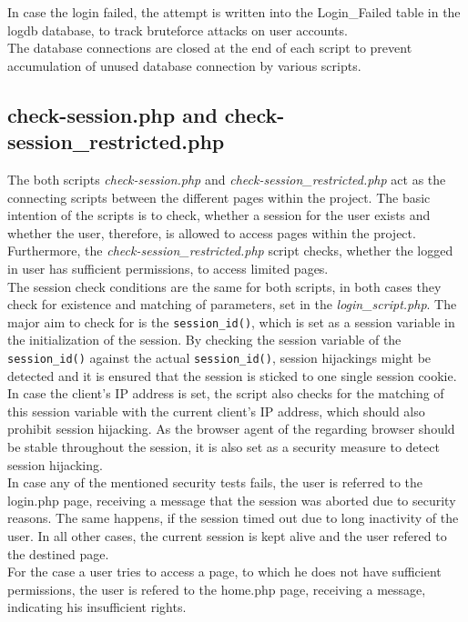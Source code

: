In case the login failed, the attempt is written into the Login\_Failed table in the logdb database, to track bruteforce attacks on user accounts.\\
The database connections are closed at the end of each script to prevent accumulation of unused database connection by various scripts.

\subsection{check-session.php and check-session\_restricted.php}
The both scripts \emph{check-session.php} and \emph{check-session\_restricted.php} act as the connecting scripts between the different pages within the project. The basic intention of the scripts is 
to check, whether a session for the user exists and whether the user, therefore, is allowed to access pages within the project. Furthermore, the \emph{check-session\_restricted.php} script checks,
whether the logged in user has sufficient permissions, to access limited pages.\\ 
The session check conditions are the same for both scripts, in both cases they check for existence and matching of parameters, set in the \emph{login\_script.php}. The major aim to check for is the 
\texttt{session\_id()}, which is set as a session variable in the initialization of the session. By checking the session variable of the \texttt{session\_id()} against the actual \texttt{session\_id()}, 
session hijackings might be detected and it is ensured that the session is sticked to one single session cookie. In case the client's IP address is set, the script also checks for the matching of this 
session variable with the current client's IP address, which should also prohibit session hijacking. As the browser agent of the regarding browser should be stable throughout the session, it is also 
set as a security measure to detect session hijacking.\\
In case any of the mentioned security tests fails, the user is referred to the login.php page, receiving a message that the session was aborted due to security reasons. The same happens, if the session 
timed out due to long inactivity of the user. In all other cases, the current session is kept alive and the user refered to the destined page.\\
For the case a user tries to access a page, to which he does not have sufficient permissions, the user is refered to the home.php page, receiving a message, indicating his insufficient rights.
